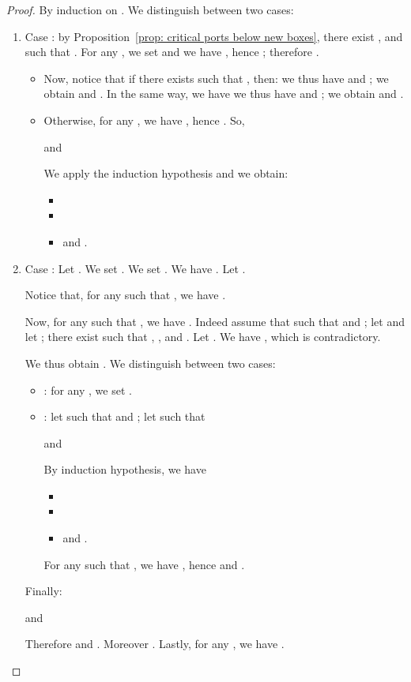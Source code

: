 \documentclass{article}
\theoremstyle{plain}
\begin{document}
\begin{proof}
By induction on . We distinguish between two cases:
\begin{enumerate}
\item Case : by Proposition~\ref{prop: critical ports below new boxes}, there exist ,  and  such that . 
For any , we set  \mbox{}  and  we have , hence ; therefore . 
\begin{itemize}
\item Now, notice that if there exists  such that , then: 
 we thus have  and ; we obtain  and . In the same way, we have
 we thus have  and ; we obtain  and .
\item Otherwise, for any , we have , hence . So, 

and

We apply the induction hypothesis and we obtain:
\begin{itemize}
\item 
\item 
\item and .
\end{itemize}
\end{itemize}
\item Case : Let . We set . We set . We have . Let . 

Notice that, for any  such that , we have .

Now, for any   such that , we have . Indeed assume that  such that  and ; let  and let ; there exist  such that , ,  and . Let . We have , which is contradictory.



We thus obtain . 
We distinguish between two cases:
\begin{itemize}
\item : for any , we set .
\item : let  such that  and ; let  such that

and

By induction hypothesis, we have
\begin{itemize}
\item 
\item 
\item and .
\end{itemize}
For any   such that , we have , hence  and . 
\end{itemize}
Finally:

and

Therefore  and . Moreover . Lastly, for any , we have .
\end{enumerate}
\end{proof}
\end{document}
